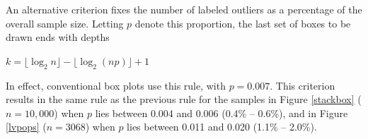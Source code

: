 \documentclass[11pt]{article}
\begin{document}
An alternative criterion fixes the number of
labeled outliers as a percentage of
the overall sample size.  Letting $p$ denote
this proportion, the last set of boxes to be
drawn ends with depths
\begin{center}
$k = \lfloor \log_2 n \rfloor - \lfloor \log_2 (np) \rfloor + 1$
\end{center}
In effect, conventional box plots use this rule, with $p = 0.007$.
This criterion results in the same rule 
as the previous rule for the samples in
Figure \ref{stackbox} ($n = 10,000$) when 
$p$ lies between 0.004 and 0.006 (0.4\% -- 0.6\%), 
and in Figure \ref{lvpops} ($n = 3068$) when
$p$ lies between 0.011 and 0.020 (1.1\% -- 2.0\%).

% 
% 
% 
% 
\end{document}
